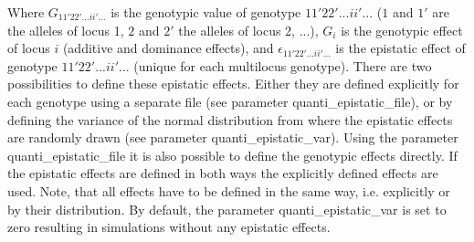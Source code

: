 \documentclass[letterpaper,12pt,oneside]{book}
\begin{document}
Where $G_{11'22'...ii'...}$ is the genotypic value of genotype ${11'22'...ii'...}$ ($1$ and $1'$ are the alleles of locus 1, $2$ and $2'$ the alleles of locus 2, ...), $G_{i}$ is the genotypic effect of locus $i$ (additive and dominance effects), and $\epsilon_{11'22'...ii'...}$ is the epistatic effect of genotype $11'22'...ii'...$ (unique for each multilocus genotype). There are two possibilities to define these epistatic effects. Either they are defined explicitly for each genotype using a separate file (see parameter \textsf{quanti\_epistatic\_file}), or by defining the variance of the normal distribution from where the epistatic effects are randomly drawn (see parameter \textsf{quanti\_epistatic\_var}). Using the parameter \textsf{quanti\_epistatic\_file} it is also possible to define the genotypic effects directly. If the epistatic effects are defined in both ways the explicitly defined effects are used. Note, that all effects have to be defined in the same way, i.e. explicitly or by their distribution. By default, the parameter \textsf{quanti\_epistatic\_var} is set to zero resulting in simulations without any epistatic effects.
\end{document}

